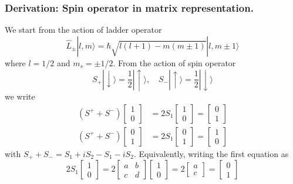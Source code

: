 \documentclass[../../../main.tex]{subfiles}
\begin{document}
\subsubsection{Derivation: Spin operator in matrix representation.}
We start from the action of ladder operator
\begin{equation*}
    \hat{L}_{\pm}   |l, m\rangle = \hbar \sqrt{l(l+1) - m(m \pm 1)}   |l, m \pm 1\rangle
\end{equation*}
where $l=1/2$ and $m_s=\pm1/2$.
From the action of spin operator
\begin{equation*}
    S_+ |\downarrow\rangle = \frac{1 }{2 } |\uparrow\rangle, \quad S_- |\uparrow\rangle = \frac{1 }{2} |\downarrow\rangle
\end{equation*}
we write
\begin{align*}
(S^+ + S^-) \begin{bmatrix}1 \\ 0 \end{bmatrix} & =  2 S_1 \begin{bmatrix}1 \\ 0 \end{bmatrix} = \begin{bmatrix}0 \\ 1 \end{bmatrix} \\
(S^+ + S^-) \begin{bmatrix}0 \\ 1 \end{bmatrix} & =  2 S_1 \begin{bmatrix}0 \\ 1 \end{bmatrix} = \begin{bmatrix}1 \\ 0 \end{bmatrix} 
\end{align*}
with $S_++S_-=S_1+iS_2-S_1-iS_2$.
Equivalently, writing the first equation as
\begin{equation*}
2S_1 \begin{bmatrix}
1 \\
0 
\end{bmatrix}  = 
2
\begin{bmatrix}
a & b \\
c & d 
\end{bmatrix}  \begin{bmatrix}
1 \\
0 
\end{bmatrix}  =
2
\begin{bmatrix}
a \\
c 
\end{bmatrix} 
= 
\begin{bmatrix}
0 \\
1 
\end{bmatrix} 
\end{equation*}
\end{document}
